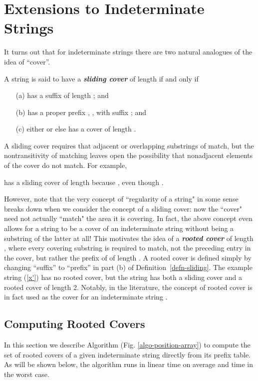 \documentclass[runningheads,a4paper]{llncs}
\def\s#1{\mbox{\boldmath }}
\def\itbf#1{\textit{\textbf{#1}}}
\begin{document}
\section{Extensions to Indeterminate Strings}
\label{sect-indet}
It turns out that for indeterminate strings there are
two natural analogues of the idea of ``cover''.

\begin{definition}
\label{defn-sliding}
A string  is said to have a \itbf{sliding cover}
of length 
if and only if
\begin{itemize}
\item[(a)]
\s{x} has a suffix \s{v} of length ; and
\item[(b)]
\s{x} has a proper prefix \s{u}, ,
with suffix ; and
\item[(c)]
either  or else \s{u} has a cover of length .
\end{itemize}
\end{definition}

A sliding cover requires that adjacent or overlapping substrings of \s{x}
match, but the nontransitivity of matching leaves open the possibility
that nonadjacent elements of the cover do not match.
For example,

has a sliding cover of length  because ,
even though .

However, note that the very concept of ``regularity of a string" in some
sense breaks down when we consider the concept of a sliding cover: now the
``cover" need not actually ``match" the area it is covering. In fact, the above
concept even allows for a string to be a cover of an indeterminate string
without being a substring of the latter at all! This motivates the idea of a
\itbf{rooted cover} of length , where every covering substring is
required to match, not the preceding entry in the cover, but rather the prefix
of \s{x} of length .
A rooted cover is defined simply by changing ``suffix'' to ``prefix''
in part (b) of Definition~\ref{defn-sliding}.
The example string (\ref{x'}) has no rooted cover,
but the string 
has both a sliding cover and a rooted cover of length 2. Notably, in the
literature, the concept of rooted cover is in fact used as the cover for an
indeterminate string \cite{BRS09}.




\subsection{Computing Rooted Covers}
In this section we describe Algorithm  (Fig. \ref{algo-position-array})
to compute  the set of rooted covers  of a given indeterminate string
 directly from its prefix table. As will be shown
below, the algorithm runs in linear time on average and  time in the
worst case.
\end{document}
